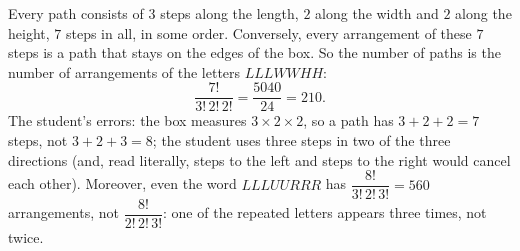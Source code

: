 Every path consists of $3$ steps along the length, $2$ along the width and $2$ along the height, $7$ steps in all, in some order. Conversely, every arrangement of these $7$ steps is a path that stays on the edges of the box. So the number of paths is the number of arrangements of the letters $LLLWWHH$:
\[\dfrac{7!}{3!\,2!\,2!}=\dfrac{5040}{24}=\boxed{210}.\]
The student's errors: the box measures $3\times2\times2$, so a path has $3+2+2=7$ steps, not $3+2+3=8$; the student uses three steps in two of the three directions (and, read literally, steps to the left and steps to the right would cancel each other). Moreover, even the word $LLLUURRR$ has $\dfrac{8!}{3!\,2!\,3!}=560$ arrangements, not $\dfrac{8!}{2!\,2!\,3!}$: one of the repeated letters appears three times, not twice.

